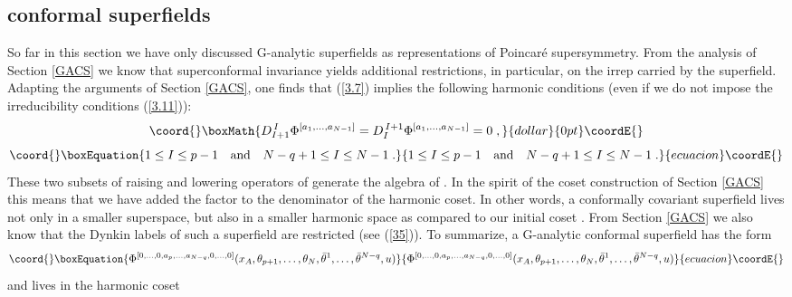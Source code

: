 \documentclass[a4paper,12pt]{article}
\begin{document}
\subsection{\coordHE{} conformal superfields}\label{npqconf}

So far in this section we have only discussed G-analytic 
superfields as representations of Poincar\'{e} supersymmetry. From the 
analysis of Section \ref{GACS} we know that superconformal 
invariance yields additional restrictions, in particular, on the 
\coordHE{} irrep carried by the superfield. Adapting the 
arguments of Section \ref{GACS}, one finds that (\ref{3.7}) 
implies the following harmonic conditions (even if we do not 
impose the \coordHE{} irreducibility conditions (\ref{3.11})): 
$$\coord{}\boxMath{
D^{\,I}_{I+1}\Phi^{[a_1,\ldots,a_{N-1}]} =  
D^{\,I+1}_{I}\Phi^{[a_1,\ldots,a_{N-1}]} = 0\;, 
}{dollar}{0pt}\coordE{}$$
\begin{equation}\coord{}\boxEquation{\label{3.12}
1\leq I \leq p-1 \quad \mbox{and} \quad N-q+1\leq I \leq N-1\;. 
}{1\leq I \leq p-1 \quad \mbox{and} \quad N-q+1\leq I \leq N-1\;. 
}{ecuacion}\coordE{}\end{equation}
These two subsets of raising and lowering operators of 
\coordHE{} generate the algebra of \coordHE{}. In the spirit of the coset construction of Section 
\ref{GACS} this means that we have added the factor 
\coordHE{} to the denominator of the 
harmonic coset. In other words, a conformally covariant \coordHE{} 
superfield lives not only in a smaller superspace, but also in a 
smaller harmonic space as compared to our initial coset 
\coordHE{}. From Section \ref{GACS} we 
also know that the Dynkin labels of such a superfield are 
restricted (see (\ref{35})). To summarize, a G-analytic conformal 
superfield has the form 
\begin{equation}\coord{}\boxEquation{\label{3.13'}
\Phi^{[0,\ldots,0,a_p,\ldots,a_{N-q},0,\ldots,0]} 
(x_A,\theta_{p+1},\ldots,\theta_{N}, 
\bar\theta^1,\ldots,\bar\theta^{N-q}, u) 
}{\Phi^{[0,\ldots,0,a_p,\ldots,a_{N-q},0,\ldots,0]} 
(x_A,\theta_{p+1},\ldots,\theta_{N}, 
\bar\theta^1,\ldots,\bar\theta^{N-q}, u) 
}{ecuacion}\coordE{}\end{equation}
and lives in the harmonic coset  
\end{document}
